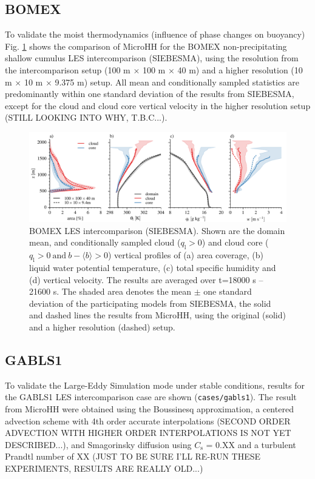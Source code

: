 \documentclass[gmd]{copernicus}
\begin{document}
\subsection{BOMEX}

To validate the moist thermodynamics (influence of phase changes on buoyancy) Fig. \ref{fig:bomex} shows the comparison of MicroHH for the BOMEX non-precipitating shallow cumulus LES intercomparison (SIEBESMA), using the resolution from the intercomparison setup (100 m $\times$ 100 m $\times$ 40 m) and a higher resolution (10 m $\times$ 10 m $\times$ 9.375 m) setup. All mean and conditionally sampled statistics are predominantly within one standard deviation of the results from SIEBESMA, except for the cloud and cloud core vertical velocity in the higher resolution setup (STILL LOOKING INTO WHY, T.B.C...). 

\begin{figure}[t]
\vspace*{2mm}
\begin{center}
\includegraphics[width=16.6cm]{figs/gmd_bomex_profs.pdf}
\end{center}
\caption{BOMEX LES intercomparison (SIEBESMA). Shown are the domain mean, and conditionally sampled cloud ($q_\mathrm{l} > 0$) and cloud core ($q_\mathrm{l}>0 \ \mathrm{and} \ b-\langle b \rangle > 0$) vertical profiles of (a) area coverage, (b) liquid water potential temperature, (c) total specific humidity and (d) vertical velocity. The results are averaged over t=18000 s -- 21600 s. The shaded area denotes the mean $\pm$ one standard deviation of the participating models from SIEBESMA, the solid and dashed lines the results from MicroHH, using the original (solid) and a higher resolution (dashed) setup.}
\label{fig:bomex}
\end{figure}

\subsection{GABLS1}
To validate the Large-Eddy Simulation mode under stable conditions, results for the GABLS1 LES intercomparison case \citep{Beare2006} are shown (\texttt{cases/gabls1}). The result from MicroHH were obtained using the Boussinesq approximation, a centered advection scheme with 4th order accurate interpolations (SECOND ORDER ADVECTION WITH HIGHER ORDER INTERPOLATIONS IS NOT YET DESCRIBED...), and Smagorinsky diffusion using $C_\mathrm{s}$ = 0.XX and a turbulent Prandtl number of XX (JUST TO BE SURE I'LL RE-RUN THESE EXPERIMENTS, RESULTS ARE REALLY OLD...)
\end{document}
